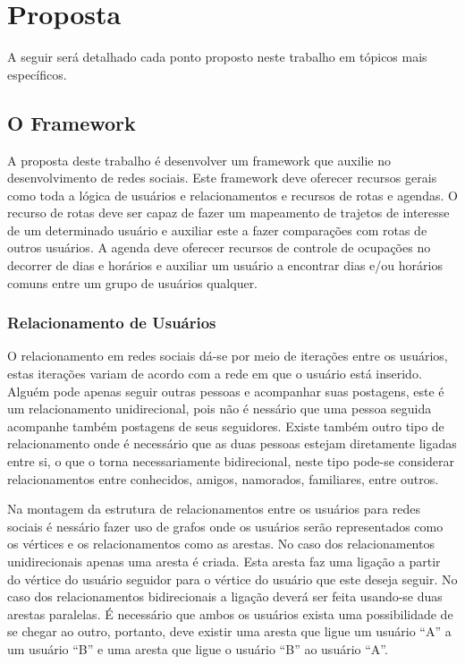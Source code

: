\chapter{Proposta}

A seguir será detalhado cada ponto proposto neste trabalho em tópicos mais específicos.

\section{O Framework}

A proposta deste trabalho é desenvolver um framework que auxilie no desenvolvimento de redes sociais. Este framework deve oferecer recursos gerais como toda a lógica de usuários e relacionamentos e recursos de rotas e agendas. O recurso de rotas deve ser capaz de fazer um mapeamento de trajetos de interesse de um determinado usuário e auxiliar este a fazer comparações com rotas de outros usuários. A agenda deve oferecer recursos de controle de ocupações no decorrer de dias e horários e auxiliar um usuário a encontrar dias e/ou horários comuns entre um grupo de usuários qualquer.

\subsection{Relacionamento de Usuários}

O relacionamento em redes sociais dá-se por meio de iterações entre os usuários, estas iterações variam de acordo com a rede em que o usuário está inserido. Alguém pode apenas seguir outras pessoas e acompanhar suas postagens, este é um relacionamento unidirecional, pois não é nessário que uma pessoa seguida acompanhe também postagens de seus seguidores. Existe também outro tipo de relacionamento onde é necessário que as duas pessoas estejam diretamente ligadas entre si, o que o torna necessariamente bidirecional, neste tipo pode-se considerar relacionamentos entre conhecidos, amigos, namorados, familiares, entre outros.

Na montagem da estrutura de relacionamentos entre os usuários para redes sociais é nessário fazer uso de grafos onde os usuários serão representados como os vértices e os relacionamentos como as arestas. No caso dos relacionamentos unidirecionais apenas uma aresta é criada. Esta aresta faz uma ligação a partir do vértice do usuário seguidor para o vértice do usuário que este deseja seguir. No caso dos relacionamentos bidirecionais a ligação deverá ser feita usando-se duas arestas paralelas. É necessário que ambos os usuários exista uma possibilidade de se chegar ao outro, portanto, deve existir uma aresta que ligue um usuário ``A'' a um usuário ``B'' e uma aresta que ligue o usuário ``B'' ao usuário ``A''.

